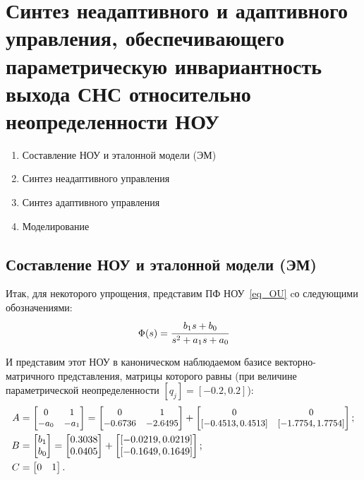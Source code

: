 \section{Синтез неадаптивного и адаптивного управления, обеспечивающего	параметрическую инвариантность выхода СНС относительно неопределенности НОУ}

\begin{enumerate}
	\item Составление НОУ и эталонной модели (ЭМ)
	\item Синтез неадаптивного управления
	\item Синтез адаптивного управления
	\item Моделирование	
\end{enumerate}

\subsection{Составление НОУ и эталонной модели (ЭМ)}

Итак, для некоторого упрощения, представим ПФ НОУ~\ref{eq_OU} cо следующими обозначениями:
\begin{equation}
	\Phi(s) = \cfrac{b_1 s + b_0}{s^2 + a_1 s + a_0}
\end{equation}

И представим этот НОУ в каноническом наблюдаемом базисе векторно-матричного представления, матрицы которого равны (при величине параметрической неопределенности $[q_j] = [-0.2, 0.2]$):
\begin{align}
	A &= 
	\small
	\begin{bmatrix}
		0 & 1\\
		-a_0 & -a_1
	\end{bmatrix}
	=
	\begin{bmatrix}
		   0&          1\\      
		-0.6736 & -2.6495
	\end{bmatrix}
	+
	\begin{bmatrix}
		0 & 0\\
		[-0.4513, 0.4513]& [-1.7754, 1.7754]
	\end{bmatrix};\\
	\normalsize
	B &=
	\begin{bmatrix}
		b_1\\
		b_0
	\end{bmatrix}
	=
	\begin{bmatrix}
		0.3038\\
		0.0405
	\end{bmatrix}
	+
	\begin{bmatrix}
		[-0.0219, 0.0219]\\
		[-0.1649, 0.1649]
	\end{bmatrix};\\
	C &= 
	\begin{bmatrix}
	0 & 1
	\end{bmatrix}.
\end{align}

